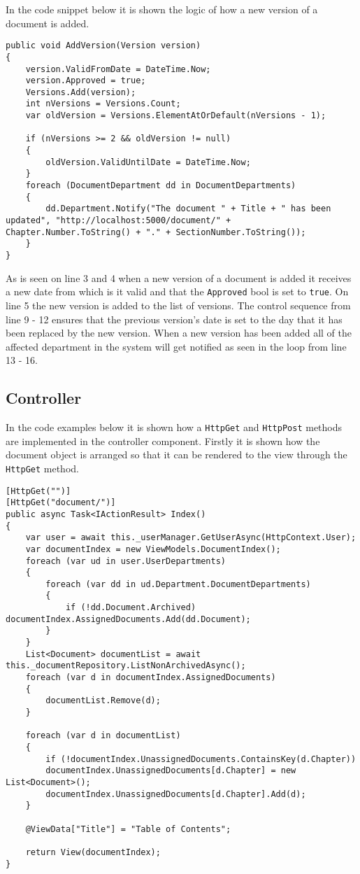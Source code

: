 In the code snippet below it is shown the logic of how a new version of a document is added.
\\

\begin{lstlisting}
public void AddVersion(Version version)
{
	version.ValidFromDate = DateTime.Now;
	version.Approved = true;
	Versions.Add(version);
	int nVersions = Versions.Count;
	var oldVersion = Versions.ElementAtOrDefault(nVersions - 1);

	if (nVersions >= 2 && oldVersion != null)
	{
		oldVersion.ValidUntilDate = DateTime.Now;
	}
	foreach (DocumentDepartment dd in DocumentDepartments)
	{
		dd.Department.Notify("The document " + Title + " has been updated", "http://localhost:5000/document/" + Chapter.Number.ToString() + "." + SectionNumber.ToString());
	}
}
\end{lstlisting}

As is seen on line 3 and 4 when a new version of a document is added it receives a new date from which is it valid and that the \texttt{Approved} bool is set to \texttt{true}.
On line 5 the new version is added to the list of versions.
The control sequence from line 9 - 12 ensures that the previous version's date is set to the day that it has been replaced by the new version.
When a new version has been added all of the affected department in the system will get notified as seen in the loop from line 13 - 16.

\subsection{Controller}

In the code examples below it is shown how a \texttt{HttpGet} and \texttt{HttpPost} methods are implemented in the controller component.
Firstly it is shown how the document object is arranged so that it can be rendered to the view through the \texttt{HttpGet} method.
\\

\begin{lstlisting}
[HttpGet("")]
[HttpGet("document/")]
public async Task<IActionResult> Index()
{
	var user = await this._userManager.GetUserAsync(HttpContext.User);
	var documentIndex = new ViewModels.DocumentIndex();
	foreach (var ud in user.UserDepartments)
	{
		foreach (var dd in ud.Department.DocumentDepartments)
		{
			if (!dd.Document.Archived) documentIndex.AssignedDocuments.Add(dd.Document);
		}
	}
	List<Document> documentList = await this._documentRepository.ListNonArchivedAsync();
	foreach (var d in documentIndex.AssignedDocuments)
	{
		documentList.Remove(d);
	}

	foreach (var d in documentList)
	{
		if (!documentIndex.UnassignedDocuments.ContainsKey(d.Chapter))
		documentIndex.UnassignedDocuments[d.Chapter] = new List<Document>();
		documentIndex.UnassignedDocuments[d.Chapter].Add(d);
	}

	@ViewData["Title"] = "Table of Contents";

	return View(documentIndex);
}
\end{lstlisting}

